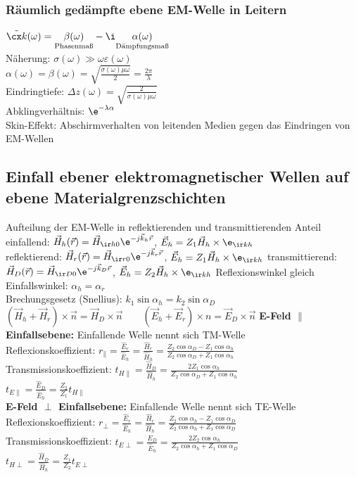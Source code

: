 \documentclass[german, fourcolumn, 6pt]{latex4ei/latex4ei_sheet}
\begin{document}
    \subsubsection{Räumlich gedämpfte ebene EM-Welle in Leitern}
$\tilde{\cx k}(\omega) = \underset{\text{Phasenmaß}}{\beta(\omega)} - \i \underset{\text{Dämpfungsmaß}}{\alpha(\omega)}$\\
    Näherung: $\sigma(\omega) \gg \omega\varepsilon(\omega)$\\
$\alpha(\omega) = \beta(\omega) = \sqrt{\frac{\sigma(\omega)\mu\omega}{2}} = \frac{2\pi}{\lambda}$\\
    Eindringtiefe: $\Delta z(\omega) = \sqrt{\frac{2}{\sigma(\omega)\mu\omega}}$\\
    Abklingverhältnis: $\e^{-\lambda\alpha}$\\
    Skin-Effekt: Abschirmverhalten von leitenden Medien gegen das Eindringen von EM-Wellen
    \subsection{Einfall ebener elektromagnetischer Wellen auf ebene Materialgrenzschichten}
    Aufteilung der EM-Welle in reflektierenden und transmittierenden Anteil\\
    einfallend: $\vec H_h(\vec r) = \vec H_{\ir h0}\e^{-j\vec k_h\vec r}$, \qquad $\vec E_h = Z_1\vec H_h \times \e_{\ir kh}$\\
    reflektierend: $\vec H_r(\vec r) = \vec H_{\ir r0}\e^{-j\vec k_r\vec r}$, \qquad $\vec E_h = Z_1\vec H_h \times \e_{\ir kh}$
    transmittierend: $\vec H_D(\vec r) = \vec H_{\ir D0}\e^{-j\vec k_D\vec r}$, \qquad $\vec E_h = Z_2\vec H_h \times \e_{\ir kh}$
    Reflexionswinkel gleich Einfallswinkel: $\alpha_h = \alpha_r$\\
    Brechungsgesetz (Snellius): $k_1\sin\alpha_h = k_2\sin\alpha_D$\\
$(\vec H_h + \vec H_r) \times \vec n = \vec H_D \times\vec n \qquad (\vec E_h + \vec E_r)\times n = \vec E_D \times \vec n$
    \textbf{E-Feld $\parallel$ Einfallsebene:} Einfallende Welle nennt sich TM-Welle\\
    Reflexionskoeffizient: $r_{\parallel} = \frac{\hat E_r}{\hat E_h} = \frac{\hat H_r}{\hat H_h} = \frac{Z_2\cos\alpha_D - Z_1\cos\alpha_h}{Z_2\cos\alpha_D + Z_1\cos\alpha_h}$\\
    Transmissionskoeffizient: $t_{H\parallel} = \frac{\hat H_D}{\hat H_h} = \frac{2Z_1\cos\alpha_h}{Z_2\cos\alpha_D+Z_1\cos\alpha_h}$\\
$t_{E\parallel} = \frac{\hat E_D}{\hat E_h} = \frac{Z_2}{Z_1}t_{H\parallel}$\\
    \textbf{E-Feld $\perp$ Einfallsebene:} Einfallende Welle nennt sich TE-Welle\\
    Reflexionskoeffizient: $r_\perp = \frac{\hat E_r}{\hat E_h} = \frac{\hat H_r}{\hat H_h} = \frac{Z_2\cos\alpha_h-Z_1\cos\alpha_D}{Z_2\cos\alpha_h+Z_1\cos\alpha_D}$\\
    Transmissionskoeffizient: $t_{E\perp} = \frac{\hat E_D}{\hat E_h} = \frac{2Z_2\cos\alpha_h}{Z_2\cos\alpha_h+Z_1\cos\alpha_D}$\\
$t_{H\perp} = \frac{\hat H_D}{\hat H_h} = \frac{Z_1}{Z_2}t_{E\perp}$\\
\end{document}
